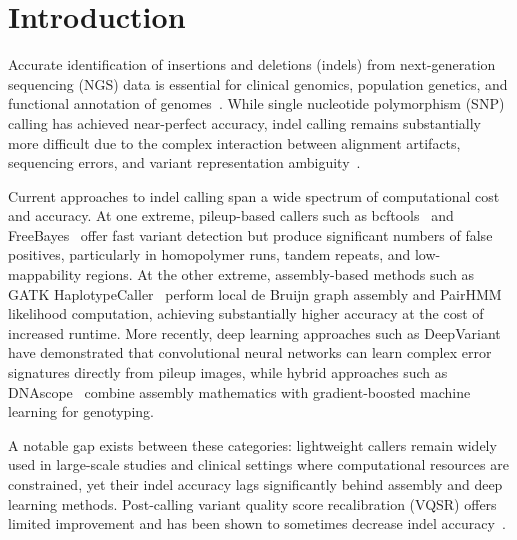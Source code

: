 \documentclass[sigconf]{acmart}
\begin{document}


\maketitle

\section{Introduction}

Accurate identification of insertions and deletions (indels) from next-generation sequencing (NGS) data is essential for clinical genomics, population genetics, and functional annotation of genomes~\cite{goldfeder2016medical}. While single nucleotide polymorphism (SNP) calling has achieved near-perfect accuracy, indel calling remains substantially more difficult due to the complex interaction between alignment artifacts, sequencing errors, and variant representation ambiguity~\cite{zook2019open, li2011statistical}.

Current approaches to indel calling span a wide spectrum of computational cost and accuracy. At one extreme, pileup-based callers such as bcftools~\cite{li2011statistical} and FreeBayes~\cite{garrison2012haplotype} offer fast variant detection but produce significant numbers of false positives, particularly in homopolymer runs, tandem repeats, and low-mappability regions. At the other extreme, assembly-based methods such as GATK HaplotypeCaller~\cite{poplin2018scaling} perform local de Bruijn graph assembly and PairHMM likelihood computation, achieving substantially higher accuracy at the cost of increased runtime. More recently, deep learning approaches such as DeepVariant~\cite{poplin2018universal} have demonstrated that convolutional neural networks can learn complex error signatures directly from pileup images, while hybrid approaches such as DNAscope~\cite{freed2022dnascope} combine assembly mathematics with gradient-boosted machine learning for genotyping.

A notable gap exists between these categories: lightweight callers remain widely used in large-scale studies and clinical settings where computational resources are constrained, yet their indel accuracy lags significantly behind assembly and deep learning methods. Post-calling variant quality score recalibration (VQSR) offers limited improvement and has been shown to sometimes decrease indel accuracy~\cite{zhao2020accuracy}.
\end{document}
